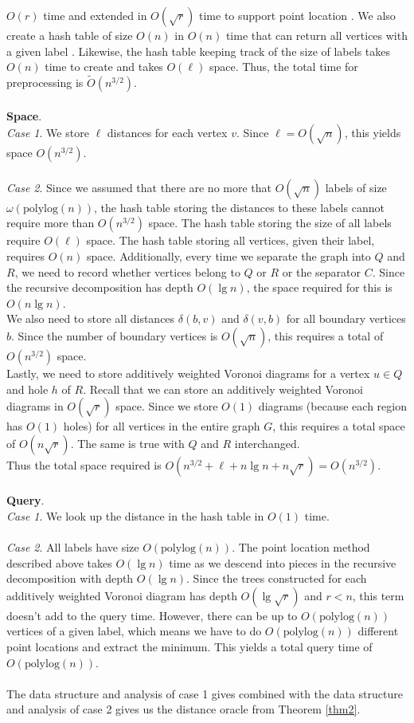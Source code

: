 $O(r)$ time and extended in $O(\sqrt{r})$ time to support point location
\cite{gawrychowski2017better}. We also create a hash table of size $O(n)$ in $O(n)$ time that can return all vertices with a given label \cite{fredman1984storing}.
Likewise, the hash table keeping track of the size of labels takes $O(n)$ time to
create and takes $O(\ell)$ space. Thus, the total time for preprocessing is $\tilde{O}(n^{3/2})$. \\
\\
\textbf{Space}. \\
\textit{Case 1}. We store $\ell$ distances for each vertex $v$. Since $\ell=O(\sqrt{n})$, this
yields space $O(n^{3/2})$. \\
\\
\textit{Case 2}. Since we assumed that there are no more that
$O(\sqrt{n})$ labels of size $\omega(\text{polylog}(n))$, the hash table storing the
distances to these labels cannot require more than $O(n^{3/2})$ space. The hash table
storing the size of all labels require $O(\ell)$ space. The hash table storing all
vertices, given their label, requires $O(n)$ space. Additionally, every time we
separate the graph into $Q$ and $R$, we need to record whether vertices belong to $Q$ or
$R$ or the separator $C$. Since the recursive decomposition has depth $O(\lg n)$, the
space required for this is $O(n\lg n)$. \\
We also need to store all distances $\delta(b,v)$ and $\delta(v,b)$ for all
boundary vertices $b$. Since the number of boundary vertices is $O(\sqrt{n})$, this
requires a total of $O(n^{3/2})$ space. \\
Lastly, we need to store additively weighted Voronoi diagrams for a vertex $u\in Q$ and
hole $h$ of $R$. Recall that we can store an additively weighted Voronoi diagrams in
$O(\sqrt{r})$ space. Since we store $O(1)$ diagrams (because each region has $O(1)$ holes) for
all vertices in the entire graph $G$, this requires a total space of $O(n\sqrt{r})$. The
same is true with $Q$ and $R$ interchanged. \\
Thus the total space required is $O(n^{3/2}+\ell+n\lg n+n\sqrt{r})=O(n^{3/2})$. \\
\\
\textbf{Query}. \\
\textit{Case 1}. We look up the distance in the hash table in $O(1)$ time.\\
\\
\textit{Case 2}. All labels have size $O(\text{polylog}(n))$. The point location method
described
above takes $O(\lg n)$ time as we descend into pieces in the recursive decomposition with depth
$O(\lg n)$. Since the trees constructed for each additively weighted Voronoi diagram has
depth $O(\lg \sqrt{r})$ and $r<n$, this term doesn't add to the query time. However,
there can be up to $O(\text{polylog}(n))$ vertices of a given label, which means we have
to do $O(\text{polylog}(n))$ different point locations and extract the minimum. This
yields a total query time of $O(\text{polylog}(n))$. \\
\\
The data structure and analysis of case 1 gives combined with the data structure and
analysis of case 2 gives us the distance oracle from Theorem \ref{thm2}.

